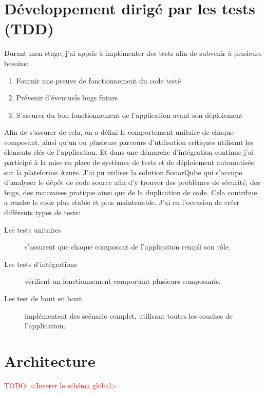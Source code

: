 \documentclass[12pt, a4paper]{report}
\makeatletter
\newcommand\TODO[1]{\textcolor{red}{TODO\@: #1}}
\makeatother
\begin{document}
        \section{Développement dirigé par les tests (TDD)}
            Durant mon stage, j'ai appris à implémenter des tests afin de subvenir à plusieurs besoins\@:
            \begin{enumerate}
                \item Fournir une preuve de fonctionnement du code testé
                \item Prévenir d'éventuels bugs futurs
                \item S'assurer du bon fonctionnement de l'application avant son déploiement
            \end{enumerate}
            Afin de s'assurer de cela, on a défini le comportement unitaire de chaque composant, ainsi qu'un ou plusieurs parcours d'utilisation critiques utilisant les éléments clés de l'application.\newline
            Et dans une démarche d'intégration continue j'ai participé à la mise en place de systèmes de tests et de déploiement automatisés sur la plateforme Azure.\newline
                J'ai pu utiliser la solution SonarQube qui s'occupe d'analyser le dépôt de code source afin d'y trouver des problèmes de sécurité, des bugs, des mauvaises pratique ainsi que de la duplication de code.\newline
                Cela contribue a rendre le code plus stable et plus maintenable.\newline
                J'ai eu l'occasion de créer différents types de tests\@:
                \begin{description}
                    \item [Les tests unitaires] s'assurent que chaque composant de l'application rempli son rôle.
                    \item [Les tests d'intégrations] vérifient un fonctionnement comportant plusieurs composants.
                    \item [Les test de bout en bout] implémentent des scénario complet, utilisant toutes les couches de l'application.
                \end{description}
        \section{Architecture}
            \TODO{<Inserer le schéma global>}
\end{document}
